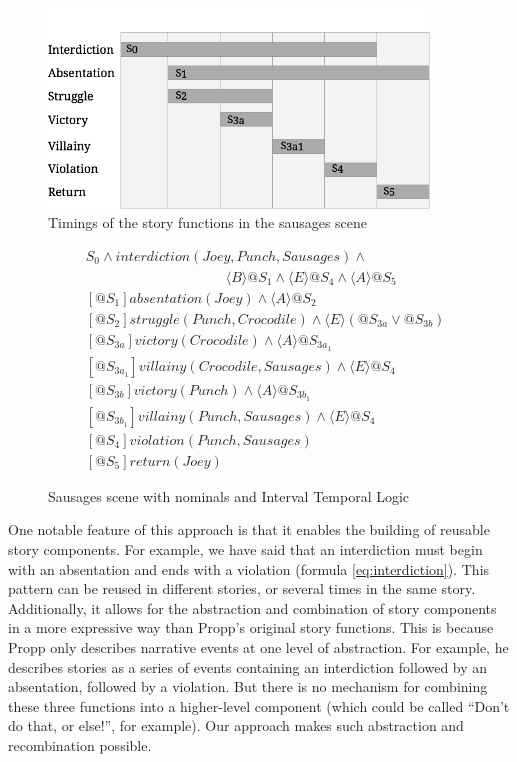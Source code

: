 \documentclass{llncs}
\begin{document}
\begin{figure}[!t]
  \centering
    \centerline{\includegraphics[width=0.9\textwidth]{durations.png}}
  \caption{Timings of the story functions in the sausages scene}\label{fig:durations}
\end{figure}
\begin{figure}[]
\begin{align}
  &S_{0} \land \mathit{interdiction(Joey, Punch, Sausages)} \land\nonumber\\
  &\qquad\qquad\qquad\qquad\qquad\langle B \rangle @S_{1} \land \langle E \rangle @S_{4} \land \langle A \rangle @S_{5}\label{eq:interdiction}\\
  &[@S_{1}] \mathit{absentation(Joey)} \land \langle A \rangle @S_{2}\label{eq:absentation}\\
  &[@S_{2}] \mathit{struggle(Punch, Crocodile)} \land \langle E \rangle (@S_{3a} \lor @S_{3b})\label{eq:struggle}\\
  &[@S_{3a}] \mathit{victory(Crocodile)} \land \langle A \rangle @S_{3a_1}\\
  &[@S_{3a_1}] \mathit{villainy(Crocodile, Sausages)} \land \langle E \rangle @S_{4}\\
  &[@S_{3b}] \mathit{victory(Punch)} \land \langle A \rangle @S_{3b_1}\\
  &[@S_{3b_1}] \mathit{villainy(Punch, Sausages)} \land \langle E \rangle @S_{4}\\
  &[@S_{4}] \mathit{violation(Punch, Sausages)}\\
  &[@S_{5}] \mathit{return(Joey)}
\end{align}
\caption{Sausages scene with nominals and Interval Temporal Logic}\label{fig:situations}
\end{figure}


One notable feature of this approach is that it enables the building of reusable story components. For example, we have said that an interdiction must begin with an absentation and ends with a violation (formula \ref{eq:interdiction}). This pattern can be reused in different stories, or several times in the same story. Additionally, it allows for the abstraction and combination of story components in a more expressive way than Propp's original story functions. This is because Propp only describes narrative events at one level of abstraction. For example, he describes stories as a series of events containing an interdiction followed by an absentation, followed by a violation. But there is no mechanism for combining these three functions into a higher-level component (which could be called ``Don't do that, or else!'', for example). Our approach makes such abstraction and recombination possible.
\end{document}
